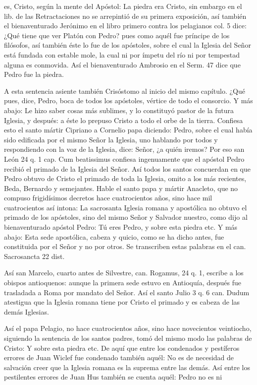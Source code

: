 es, Cristo, según la mente del Apóstol: La piedra era Cristo, sin embargo en el lib. de las Retractaciones no se arrepintió de su primera exposición, así también el bienaventurado Jerónimo en el libro primero contra los pelagianos col. 5 dice: ¿Qué tiene que ver Platón con Pedro? pues como aquél fue príncipe de los filósofos, así también éste lo fue de los apóstoles, sobre el cual la Iglesia del Señor está fundada con estable mole, la cual ni por ímpetu del río ni por tempestad alguna es conmovida. Así el bienaventurado Ambrosio en el Serm. 47 dice que Pedro fue la piedra.

A esta sentencia asiente también Crisóstomo al inicio del mismo capítulo. ¿Qué pues, dice, Pedro, boca de todos los apóstoles, vértice de todo el consorcio. Y más abajo: Le hizo saber cosas más sublimes, y lo constituyó pastor de la futura Iglesia, y después: a éste lo prepuso Cristo a todo el orbe de la tierra. Confiesa esto el santo mártir Cipriano a Cornelio papa diciendo: Pedro, sobre el cual había sido edificada por el mismo Señor la Iglesia, uno hablando por todos y respondiendo con la voz de la Iglesia, dice: Señor, ¿a quién iremos? Por eso san León 24 q. 1 cap. Cum beatissimus confiesa ingenuamente que el apóstol Pedro recibió el primado de la Iglesia del Señor. Así todos los santos concuerdan en que Pedro obtuvo de Cristo el primado de toda la Iglesia, omito a los más recientes, Beda, Bernardo y semejantes. Hable el santo papa y mártir Anacleto, que no compuso frigidísimos decretos hace cuatrocientos años, sino hace mil cuatrocientos así intona: La sacrosanta Iglesia romana y apostólica no obtuvo el primado de los apóstoles, sino del mismo Señor y Salvador nuestro, como dijo al bienaventurado apóstol Pedro: Tú eres Pedro, y sobre esta piedra etc. Y más abajo: Esta sede apostólica, cabeza y quicio, como se ha dicho antes, fue constituida por el Señor y no por otros. Se transcriben estas palabras en el can. Sacrosancta 22 dist.

\marginpar{\small[275]} Así san Marcelo, cuarto antes de Silvestre, can. Rogamus, 24 q. 1, escribe a los obispos antioquenos: aunque la primera sede estuvo en Antioquía, después fue trasladada a Roma por mandato del Señor. Así el santo Julio 3 q. 6 can. Dudum atestigua que la Iglesia romana tiene por Cristo el primado y es cabeza de las demás Iglesias.

Así el papa Pelagio, no hace cuatrocientos años, sino hace novecientos veintiocho, siguiendo la sentencia de los santos padres, tomó del mismo modo las palabras de Cristo: Y sobre esta piedra etc. De aquí que entre los condenados y pestíferos errores de Juan Wiclef fue condenado también aquél: No es de necesidad de salvación creer que la Iglesia romana es la suprema entre las demás. Así entre los pestilentes errores de Juan Hus también se cuenta aquél: Pedro no es ni


